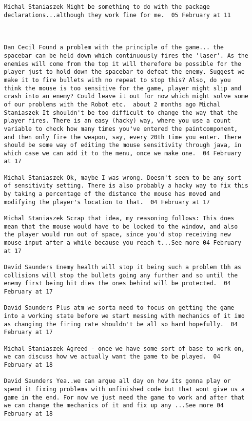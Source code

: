\begin{verbatim}
Michal Staniaszek Might be something to do with the package
declarations...although they work fine for me.  05 February at 11



Dan Cecil Found a problem with the principle of the game... the
spacebar can be held down which continuously fires the 'laser'. As the
enemies will come from the top it will therefore be possible for the
player just to hold down the spacebar to defeat the enemy. Suggest we
make it to fire bullets with no repeat to stop this? Also, do you
think the mouse is too sensitive for the game, player might slip and
crash into an enemy? Could leave it out for now which might solve some
of our problems with the Robot etc.  about 2 months ago Michal
Staniaszek It shouldn't be too difficult to change the way that the
player fires. There is an easy (hacky) way, where you use a count
variable to check how many times you've entered the paintcomponent,
and then only fire the weapon, say, every 20th time you enter. There
should be some way of editing the mouse sensitivity through java, in
which case we can add it to the menu, once we make one.  04 February
at 17

Michal Staniaszek Ok, maybe I was wrong. Doesn't seem to be any sort
of sensitivity setting. There is also probably a hacky way to fix this
by taking a percentage of the distance the mouse has moved and
modifying the player's location to that.  04 February at 17

Michal Staniaszek Scrap that idea, my reasoning follows: This does
mean that the mouse would have to be locked to the window, and also
the player would run out of space, since you'd stop receiving new
mouse input after a while because you reach t...See more 04 February
at 17

David Saunders Enemy health will stop it being such a problem tbh as
collisions will stop the bullets going any further and so until the
enemy first being hit dies the ones behind will be protected.  04
February at 17

David Saunders Plus atm we sorta need to focus on getting the game
into a working state before we start messing with mechanics of it imo
as changing the firing rate shouldn't be all so hard hopefully.  04
February at 17

Michal Staniaszek Agreed - once we have some sort of base to work on,
we can discuss how we actually want the game to be played.  04
February at 18

David Saunders Yea..we can argue all day on how its gonna play or
spend it fixing problems with unfinished code but that wont give us a
game in the end. For now we just need the game to work and after that
we can change the mechanics of it and fix up any ...See more 04
February at 18


\end{verbatim}

